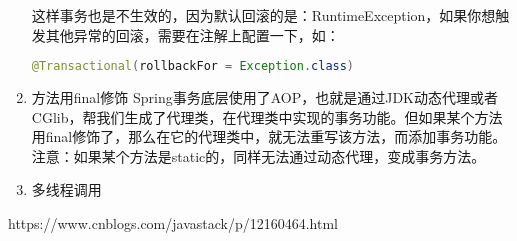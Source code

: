 \documentclass[../../../interview-questions.tex]{subfiles}
\begin{document}
\begin{enumerate}
    这样事务也是不生效的，因为默认回滚的是：RuntimeException，如果你想触发其他异常的回滚，需要在注解上配置一下，如：

\begin{lstlisting}[language=Java]
@Transactional(rollbackFor = Exception.class)
\end{lstlisting}

    \item {方法用final修饰} Spring事务底层使用了AOP，也就是通过JDK动态代理或者CGlib，帮我们生成了代理类，在代理类中实现的事务功能。但如果某个方法用final修饰了，那么在它的代理类中，就无法重写该方法，而添加事务功能。注意：如果某个方法是static的，同样无法通过动态代理，变成事务方法。
    \item {多线程调用}
\end{enumerate}

https://www.cnblogs.com/javastack/p/12160464.html
\end{document}

